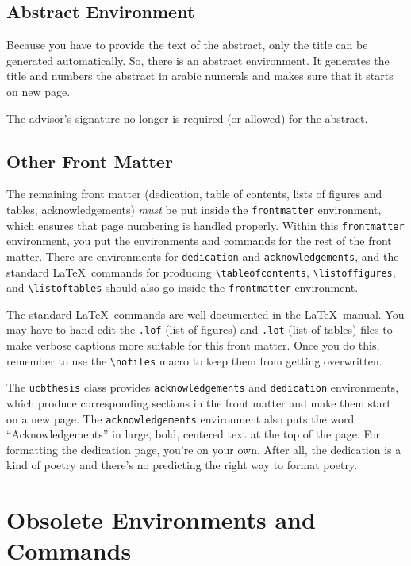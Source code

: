 \documentclass[11pt]{article}
\newcommand*{\pkg}[1]{\texttt{#1}}
\begin{document}
\subsection{Abstract Environment}

Because you have to provide the text of the abstract, only the title
can be generated automatically.  So, there is an abstract environment.
It generates the title and numbers the abstract in arabic numerals and
makes sure that it starts on new page.

The advisor's signature no longer is required (or allowed) for the
abstract.

\subsection{Other Front Matter}

The remaining front matter (dedication, table of contents, lists of
figures and tables, acknowledgements) \emph{must} be put inside the
\verb|frontmatter| environment, which ensures that page numbering is
handled properly.  Within this \verb|frontmatter| environment, you put the
environments and commands for the rest of the front matter.  There are
environments for \texttt{dedication} and \texttt{acknowledgements},
and the standard \LaTeX\ commands for producing \verb|\tableofcontents|,
\verb|\listoffigures|, and \verb|\listoftables| should also go inside
the \verb|frontmatter| environment.

The standard \LaTeX\ commands are well documented in the \LaTeX\ manual.
You may have to hand edit the \texttt{.lof} (list of figures) and
\texttt{.lot} (list of tables) files to make verbose captions more suitable for
this front matter.  Once you do this, remember to use the \verb|\nofiles|
macro to keep them from getting overwritten.

The \pkg{ucbthesis} class provides \texttt{acknowledgements} and
\texttt{dedication} environments, which produce corresponding sections in
the front matter and make them start on a new page.  The
\texttt{acknowledgements}
environment also puts the word ``Acknowledgements'' in large, bold,
centered text at the top of the page.  For formatting the dedication page,
you're on your own.  After all, the dedication is a kind of poetry and
there's no predicting the right way to format poetry.

\section{Obsolete Environments and Commands}
\end{document}
